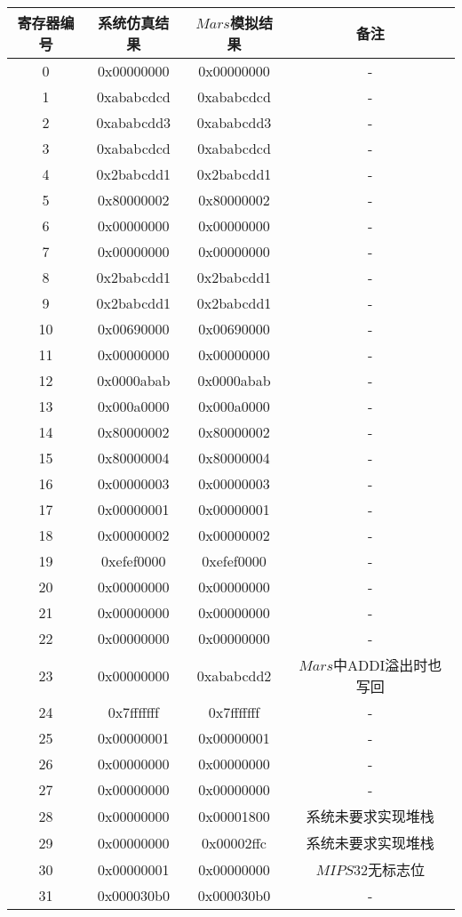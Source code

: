 \documentclass[main.tex]{subfiles}
\begin{document}
\begin{center}
    \begin{longtable}[]{c c c c}
        \toprule
        寄存器编号 & 系统仿真结果 & $Mars$模拟结果 & 备注 \\
        \midrule
        0 & 0x00000000 & 0x00000000 &  - \\
        1 & 0xababcdcd & 0xababcdcd &  - \\
        2 & 0xababcdd3 & 0xababcdd3 &  - \\
        3 & 0xababcdcd & 0xababcdcd &  - \\
        4 & 0x2babcdd1 & 0x2babcdd1 &  - \\
        5 & 0x80000002 & 0x80000002 &  - \\
        6 & 0x00000000 & 0x00000000 &  - \\
        7 & 0x00000000 & 0x00000000 &  - \\
        8 & 0x2babcdd1 & 0x2babcdd1 &  - \\
        9 & 0x2babcdd1 & 0x2babcdd1 &  - \\
        10 & 0x00690000 & 0x00690000 &  - \\
        11 & 0x00000000 & 0x00000000 &  - \\
        12 & 0x0000abab & 0x0000abab &  - \\
        13 & 0x000a0000 & 0x000a0000 &  - \\
        14 & 0x80000002 & 0x80000002 &  - \\
        15 & 0x80000004 & 0x80000004 &  - \\
        16 & 0x00000003 & 0x00000003 &  - \\
        17 & 0x00000001 & 0x00000001 &  - \\
        18 & 0x00000002 & 0x00000002 &  - \\
        19 & 0xefef0000 & 0xefef0000 &  - \\
        20 & 0x00000000 & 0x00000000 &  - \\
        21 & 0x00000000 & 0x00000000 &  - \\
        22 & 0x00000000 & 0x00000000 &  - \\
        23 & 0x00000000 & 0xababcdd2 &  $Mars$中ADDI溢出时也写回 \\
        24 & 0x7fffffff & 0x7fffffff &  - \\
        25 & 0x00000001 & 0x00000001 &  - \\
        26 & 0x00000000 & 0x00000000 &  - \\
        27 & 0x00000000 & 0x00000000 &  - \\
        28 & 0x00000000 & 0x00001800 &  系统未要求实现堆栈 \\
        29 & 0x00000000 & 0x00002ffc &  系统未要求实现堆栈 \\
        30 & 0x00000001 & 0x00000000 &  $MIPS32$无标志位 \\
        31 & 0x000030b0 & 0x000030b0 &  - \\
        \bottomrule
    \end{longtable}
\end{center}
\end{document}
